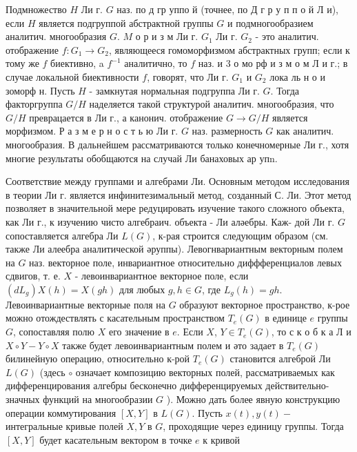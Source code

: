 \documentclass[10pt]{article}
\begin{document}
Подмножество $H$ Ли г. $G$ наз. по д гр уппо й (точнее, по Д г р у п п о й Л и), если $H$ является подгруппой абстрактной группы $G$ и подмногообразием аналитич. многообразия $G$. $M$ о р и з м Ли г. $G_{1}$ Ли г. $G_{2}$ - это аналитич. отображение $f: G_{1} \rightarrow G_{2}$, являющееся гомоморфизмом абстрактных групп; если к тому же $f$ биективно, a $f^{-1}$ аналитично, то $f$ наз. и 3 о мо рф и з м о м Л и г.; в случае локальной биективности $f$, говорят, что Ли г. $G_{1}$ и $G_{2}$ лока ль н о и зоморф н. Пусть $H$ - замкнутая нормальная подгруппа Ли г. $G$. Тогда факторгруппа $G / H$ наделяется такой структурой аналитич. многообразия, что $G / H$ преврацается в Ли г., а канонич. отображение $G \rightarrow G / H$ является морфизмом. Р а з м е р н о с т ь ю Ли г. $G$ наз. размерность $G$ как аналитич. многообразия. В дальнейшем рассматриваются только конечномерные Ли г., хотя многие результаты обобщаются на случай Ли банаховых ар упn.



Соответствие между группами и алгебрами Ли. Основным методом исследования в теории Ли г. является инфинитезимальный метод, созданный С. Ли. Этот метод позволяет в значительной мере редуцировать изучение такого сложного объекта, как Ли г., к изучению чисто алгебраич. объекта - Ли аләебры. Каж- дой Ли г. $G$ сопоставляется алгебра Ли $L(G)$, к-рая строится следующим образом (см. также Ли алеебра аналитической әруппы). Левогнвариантным векторным полем на $G$ наз. векторное поле, инвариантное относительно диффференциалов левых сдвигов, т. е. $X$ - левоинвариантное векторное поле, если $\left(d L_{g}\right) X(h)=X(g h)$ для любых $g, h \in G$, где $L_{g}(h)=g h$. Левоинвариантные векторные поля на $G$ образуют векторное пространство, к-рое можно отождествлять с касательным пространством $T_{e}(G)$ в единице $e$ группы $G$, сопоставляя полю $X$ его значение в $e$. Если $X$, $Y \in T_{e}(G)$, то с к о б к а Л и $X \circ Y-Y \circ X$ также будет левоинвариантным полем и әто задает в $T_{e}(G)$ билинейную операцию, относительно к-рой $T_{e}(G)$ становится алгеброй Ли $L(G)$ (здесь $\circ$ означает композицию векторных полей, рассматриваемых как дифференцирования алгебры бесконечно дифференцируемых действительно-значных функций на многообразии $G$ ). Можно дать более явную конструкцию операции коммутирования $[X, Y]$ в $L(G)$. Пусть $x(t), y(t)-$ интегральные кривые полей $X, Y$ в $G$, проходящие через единицу группы. Тогда $[X, Y]$ будет касательным вектором в точке $e$ к кривой
\end{document}

